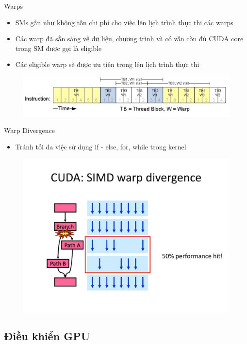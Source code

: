 \documentclass[10pt]{beamer}
\theoremstyle{remark}
\numberwithin{algocf}{section}
\numberwithin{equation}{section}
\numberwithin{dl}{section}
\numberwithin{figure}{section}
\begin{document}
\begin{frame}{Warps}
    \begin{itemize}
        \item SMs gần như không tốn chi phí cho việc lên lịch trình thực thi các warps
        \item Các warp đã sẵn sàng về dữ liệu, chương trình và có vẫn còn đủ CUDA core trong SM được gọi là eligible
        \item Các eligible warp sẽ được ưu tiên trong lên lịch trình thực thi 
    \end{itemize}

    \begin{figure}[H]
        \centering
        \includegraphics[width=0.8\linewidth]{figures/CUDA/Eligible_Stall_Warps.png}
    \end{figure}
\end{frame}

\begin{frame}{Warp Divergence}
    \begin{itemize}
        \item Tránh tối đa việc sử dụng if - else, for, while trong kernel 
    \end{itemize}
    \begin{figure}[H]
        \centering
        \includegraphics[width=0.7\linewidth]{figures/CUDA/Warp_Divergence.jpg}
    \end{figure}
\end{frame}

\subsection{Điều khiển GPU}
\end{document}
